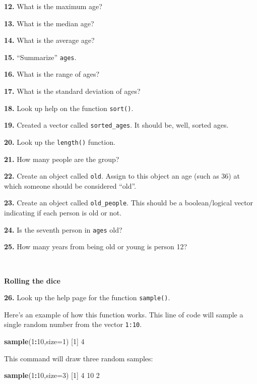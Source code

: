 \documentclass[]{book}
\newenvironment{Shaded}{\begin{snugshade}}{\end{snugshade}}
\newcommand{\DataTypeTok}[1]{\textcolor[rgb]{0.13,0.29,0.53}{#1}}
\newcommand{\DecValTok}[1]{\textcolor[rgb]{0.00,0.00,0.81}{#1}}
\newcommand{\KeywordTok}[1]{\textcolor[rgb]{0.13,0.29,0.53}{\textbf{#1}}}
\newcommand{\NormalTok}[1]{#1}
\newcommand{\OperatorTok}[1]{\textcolor[rgb]{0.81,0.36,0.00}{\textbf{#1}}}
\begin{document}
\textbf{12.} What is the maximum age?

\textbf{13.} What is the median age?

\textbf{14.} What is the average age?

\textbf{15.} ``Summarize'' \texttt{ages}.

\textbf{16.} What is the range of ages?

\textbf{17.} What is the standard deviation of ages?

\textbf{18.} Look up help on the function \texttt{sort()}.

\textbf{19.} Created a vector called \texttt{sorted\_ages}. It should be, well, sorted ages.

\textbf{20.} Look up the \texttt{length()} function.

\textbf{21.} How many people are the group?

\textbf{22.} Create an object called \texttt{old}. Assign to this object an age (such as 36) at which someone should be considered ``old''.

\textbf{23.} Create an object called \texttt{old\_people}. This should be a boolean/logical vector indicating if each person is old or not.

\textbf{24.} Is the seventh person in \texttt{ages} old?

\textbf{25.} How many years from being old or young is person 12?

~

\textbf{Rolling the dice}

\textbf{26.} Look up the help page for the function \texttt{sample()}.

Here's an example of how this function works. This line of code will sample a single random number from the vector \texttt{1:10}.

\begin{Shaded}
\begin{Highlighting}[]
\KeywordTok{sample}\NormalTok{(}\DecValTok{1}\OperatorTok{:}\DecValTok{10}\NormalTok{,}\DataTypeTok{size=}\DecValTok{1}\NormalTok{)}
\NormalTok{[}\DecValTok{1}\NormalTok{] }\DecValTok{4}
\end{Highlighting}
\end{Shaded}

This command will draw three random samples:

\begin{Shaded}
\begin{Highlighting}[]
\KeywordTok{sample}\NormalTok{(}\DecValTok{1}\OperatorTok{:}\DecValTok{10}\NormalTok{,}\DataTypeTok{size=}\DecValTok{3}\NormalTok{)}
\NormalTok{[}\DecValTok{1}\NormalTok{]  }\DecValTok{4} \DecValTok{10}  \DecValTok{2}
\end{Highlighting}
\end{Shaded}
\end{document}
